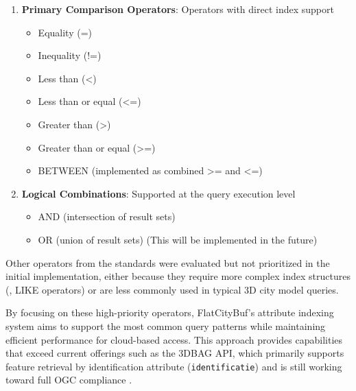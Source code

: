 \begin{enumerate}
  \item \textbf{Primary Comparison Operators}: Operators with direct index support
    \begin{itemize}
      \item Equality (=)
      \item Inequality (!=)
      \item Less than (<)
      \item Less than or equal (<=)
      \item Greater than (>)
      \item Greater than or equal (>=)
      \item BETWEEN (implemented as combined >= and <=)
    \end{itemize}

  \item \textbf{Logical Combinations}: Supported at the query execution level
    \begin{itemize}
      \item AND (intersection of result sets)
      \item OR (union of result sets) (This will be implemented in the future)
    \end{itemize}

\end{enumerate}

Other operators from the standards were evaluated but not prioritized in the initial implementation, either because they require more complex index structures (\eg, LIKE operators) or are less commonly used in typical 3D city model queries.

By focusing on these high-priority operators, FlatCityBuf's attribute indexing system aims to support the most common query patterns while maintaining efficient performance for cloud-based access. This approach provides capabilities that exceed current offerings such as the 3DBAG API, which primarily supports feature retrieval by identification attribute (\texttt{identificatie}) and is still working toward full OGC compliance \citep{3dbag_api_2023}.

